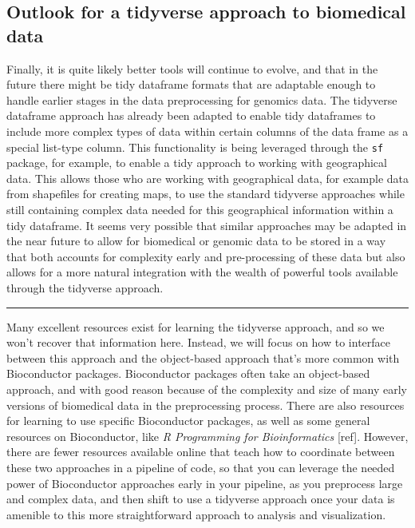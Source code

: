 \documentclass[]{tufte-book}
\begin{document}
\subsection{Outlook for a tidyverse approach to biomedical data}\label{outlook-for-a-tidyverse-approach-to-biomedical-data}

Finally, it is quite likely better tools will continue to evolve, and that in
the future there might be tidy dataframe formats that are adaptable enough to
handle earlier stages in the data preprocessing for genomics data. The tidyverse
dataframe approach has already been adapted to enable tidy dataframes to include
more complex types of data within certain columns of the data frame as a special
list-type column. This functionality is being leveraged through the \texttt{sf}
package, for example, to enable a tidy approach to working with geographical
data. This allows those who are working with geographical data, for example data
from shapefiles for creating maps, to use the standard tidyverse approaches
while still containing complex data needed for this geographical information
within a tidy dataframe. It seems very possible that similar approaches may be
adapted in the near future to allow for biomedical or genomic data to be stored
in a way that both accounts for complexity early and pre-processing of these
data but also allows for a more natural integration with the wealth of powerful
tools available through the tidyverse approach.

\begin{center}\rule{0.5\linewidth}{0.5pt}\end{center}

Many excellent
resources exist for learning the tidyverse approach, and so we won't recover that
information here. Instead, we will focus on how to interface between this
approach and the object-based approach that's more common with Bioconductor
packages. Bioconductor packages often take an object-based approach, and with
good reason because of the complexity and size of many early versions of
biomedical data in the preprocessing process. There are also resources for
learning to use specific Bioconductor packages, as well as some general
resources on Bioconductor, like \emph{R Programming for Bioinformatics} {[}ref{]}.
However, there are fewer resources available online that teach how to coordinate
between these two approaches in a pipeline of code, so that you can leverage the
needed power of Bioconductor approaches early in your pipeline, as you
preprocess large and complex data, and then shift to use a tidyverse approach
once your data is amenible to this more straightforward approach to analysis and
visualization.
\end{document}
